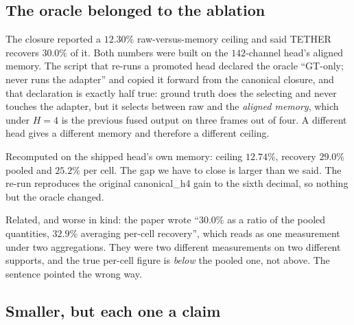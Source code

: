 \documentclass[11pt,a4paper]{article}
\begin{document}
\subsection*{The oracle belonged to the ablation}

The closure reported a $12.30\%$ raw-versus-memory ceiling and said TETHER
recovers $30.0\%$ of it. Both numbers were built on the $142$-channel head's
aligned memory. The script that re-runs a promoted head declared the oracle
``GT-only; never runs the adapter'' and copied it forward from the canonical
closure, and that declaration is exactly half true: ground truth does the
selecting and never touches the adapter, but it selects between raw and the
\emph{aligned memory}, which under $H{=}4$ is the previous fused output on
three frames out of four. A different head gives a different memory and
therefore a different ceiling.

Recomputed on the shipped head's own memory: ceiling $12.74\%$, recovery
$29.0\%$ pooled and $25.2\%$ per cell. The gap we have to close is larger than
we said. The re-run reproduces the original canonical\_h4 gain to the sixth
decimal, so nothing but the oracle changed.

Related, and worse in kind: the paper wrote ``$30.0\%$ as a ratio of the pooled
quantities, $32.9\%$ averaging per-cell recovery'', which reads as one
measurement under two aggregations. They were two different measurements on two
different supports, and the true per-cell figure is \emph{below} the pooled one,
not above. The sentence pointed the wrong way.

\subsection*{Smaller, but each one a claim}
\end{document}
